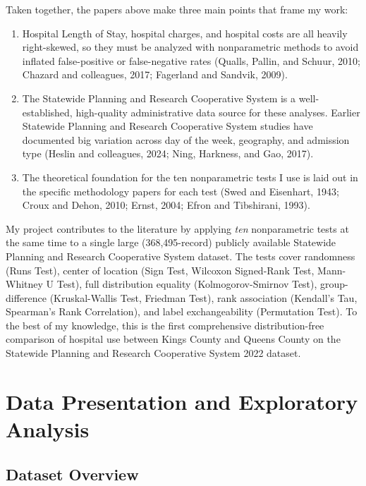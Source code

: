 \documentclass[12pt]{article}
\begin{document}
Taken together, the papers above make three main points that frame
my work:

\begin{enumerate}[nosep]
  \item Hospital Length of Stay, hospital charges, and hospital costs
    are all heavily right-skewed, so they must be analyzed with
    nonparametric methods to avoid inflated false-positive or
    false-negative rates (Qualls, Pallin, and Schuur, 2010;
    Chazard and colleagues, 2017; Fagerland and Sandvik, 2009).
  \item The Statewide Planning and Research Cooperative System is a
    well-established, high-quality administrative data source for
    these analyses. Earlier Statewide Planning and Research Cooperative System studies have documented big
    variation across day of the week, geography, and admission type
    (Heslin and colleagues, 2024; Ning, Harkness, and Gao, 2017).
  \item The theoretical foundation for the ten nonparametric tests
    I use is laid out in the specific methodology papers for each
    test (Swed and Eisenhart, 1943; Croux and Dehon, 2010; Ernst,
    2004; Efron and Tibshirani, 1993).
\end{enumerate}

My project contributes to the literature by applying \emph{ten}
nonparametric tests at the same time to a single large
(368,495-record) publicly available Statewide Planning and Research
Cooperative System dataset. The tests cover randomness (Runs Test),
center of location (Sign Test, Wilcoxon Signed-Rank Test, Mann-Whitney
U Test), full distribution equality (Kolmogorov-Smirnov Test),
group-difference (Kruskal-Wallis Test, Friedman Test), rank
association (Kendall's Tau, Spearman's Rank Correlation), and label
exchangeability (Permutation Test). To the best of my knowledge, this
is the first comprehensive distribution-free comparison of hospital
use between Kings County and Queens County on the Statewide Planning
and Research Cooperative System 2022 dataset.

\section{Data Presentation and Exploratory Analysis}

\subsection{Dataset Overview}
\end{document}
